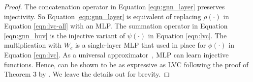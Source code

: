 

\lvcgnn*

\begin{proof}
    The concatenation operator in Equation \ref{eqn:gnn_layer} preserves injectivity. So Equation \ref{eqn:gnn_layer} is equivalent of replacing $\rho(\cdot)$ in Equation \ref{eqn:lvc-all} with an MLP. The summation operator in Equation \ref{eqn:gnn_huv} is the injective variant of $\psi(\cdot)$ in Equation \ref{eqn:lvc}. The multiplication with $W_c$ is a single-layer MLP that used in place for $\phi(\cdot)$ in Equation \ref{eqn:lvc}. As a universal approximator~\citep{DBLP:journals/nn/Hornik91,DBLP:journals/nn/HornikSW89}, MLP can learn injective functions.
    Hence, \model{} can be shown to be as expressive as LVC following the proof of Theorem 3 by \citet{xu2018powerful}. We leave the details out for brevity.
\end{proof}






